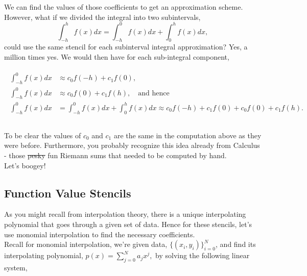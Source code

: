 \documentclass[paper=a4, fontsize=11pt]{scrartcl} %
\numberwithin{equation}{section} %
\numberwithin{figure}{section} %
\numberwithin{table}{section} %
\begin{document}
We can find the values of those coefficients to get an approximation scheme. However, what if we divided the integral into two subintervals, $$\displaystyle\int_{-h}^{h} f(x) dx = \displaystyle\int_{-h}^{0} f(x) dx + \displaystyle\int_{0}^{h} f(x) dx,$$ could use the same stencil for each subinterval integral approximation? Yes, a million times yes. We would then have for each sub-integral component,

\begin{align}
\nonumber
\begin{split}
\displaystyle\int_{-h}^{0} f(x) dx  &\approx c_0 f(-h) + c_1 f(0), \\
\displaystyle\int_{-h}^{0} f(x) dx  &\approx c_0 f(0) + c_1 f(h), \ \ \ \mbox{ and hence }\\
\displaystyle\int_{-h}^{0} f(x) dx  &= \displaystyle\int_{-h}^{0} f(x) dx + \displaystyle\int_{0}^{h} f(x) dx \approx c_0 f(-h) + c_1 f(0) + c_0 f(0) + c_1 f(h). \\ \\
\end{split}
\end{align}

To be clear the values of $c_0$ and $c_1$ are the same in the computation above as they were before. Furthermore, you probably recognize this idea already from Calculus - those \sout{pesky} fun Riemann sums that needed to be computed by hand. \\

Let's boogey!\\


\subsection{Function Value Stencils}

As you might recall from interpolation theory, there is a unique interpolating polynomial that goes through a given set of data. Hence for these stencils, let's use monomial interpolation to find the necessary coefficients. \\

Recall for monomial interpolation, we're given data, $\displaystyle\{(x_i,y_i)\}_{i=0}^{N}$, and find its interpolating polynomial, $\displaystyle p(x)=\sum_{j=0}^{N} a_j x^j,$ by solving the following linear system,\\
\end{document}
